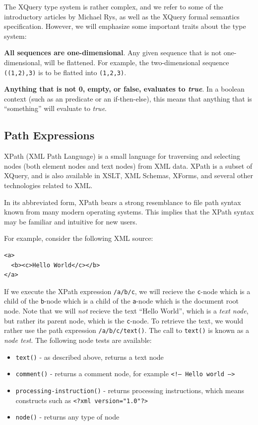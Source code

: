 The XQuery type system is rather complex, and we refer to some of the
introductory articles\cite{rys_xq_type_intro} by Michael Rys, as well as the
XQuery formal semantics specification\cite{xquery_semantics}. However, we will
emphasize some important traits about the type system: 

\textbf{All sequences are one-dimensional}. Any given sequence that is not
one-dimensional, will be flattened. For example, the two-dimensional sequence
\verb!((1,2),3)! is to be flatted into \verb!(1,2,3)!.

\textbf{Anything that is not 0, empty, or false, evaluates to \textit{true}}.
In a boolean context (such as an predicate or an if-then-else), this means that
anything that is ``something'' will evaluate to \textit{true}.

\subsection{Path Expressions}
\label{sect:theory:xqueryPathExpressions}
XPath (XML Path Language) is a small language for traversing and selecting
nodes (both element nodes and text nodes) from XML data. XPath is a subset of
XQuery, and is also available in XSLT, XML Schemas, XForms, and several other
technologies related to XML. 

In its abbreviated form, XPath bears a strong resemblance to file path syntax
known from many modern operating systems. This implies that the XPath syntax
may be familiar and intuitive for new users.

For example, consider the following XML source:
\begin{verbatim}
<a>
  <b><c>Hello World</c></b>
</a>
\end{verbatim}
If we execute the XPath expression \verb!/a/b/c!, we will recieve the
\verb!c!-node which is a child of the \verb!b!-node which is a child of the
\verb!a!-node which is the document root node. Note that we will \textit{not}
recieve the text ``Hello World'', which is a \textit{text node}, but rather its
parent node, which is the \verb!c!-node. To retrieve the text, we would rather
use the path expression \verb!/a/b/c/text()!. The call to \verb!text()! is
known as a \textit{node test}. The following node tests are available:
\begin{itemize}
  \item \verb!text()! - as described above, returns a text node
  \item \verb!comment()! - returns a comment node, for example \texttt{<!-- Hello
  world -->}
  \item \verb!processing-instruction()! - returns processing instructions, which
  means constructs such as \texttt{<?xml version="1.0"?>}
  \item \verb!node()! - returns any type of node 
\end{itemize} 

